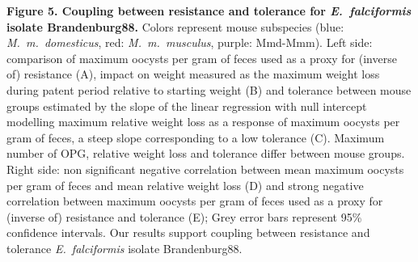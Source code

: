 \documentclass[12pt]{article}
\begin{document}
\textbf{Figure 5. Coupling between resistance and tolerance for \textit{E.~falciformis} isolate Brandenburg88.} Colors represent mouse subspecies (blue: \textit{M.~m.~domesticus}, red: \textit{M.~m.~musculus}, purple: Mmd-Mmm). Left side: comparison of maximum oocysts per gram of feces used as a proxy for (inverse of) resistance (A), impact on weight measured as the maximum weight loss during patent period relative to starting weight (B) and tolerance between mouse groups estimated by the slope of the linear regression with null intercept modelling maximum relative weight loss as a response of maximum oocysts per gram of feces, a steep slope corresponding to a low tolerance (C). Maximum number of OPG, relative weight loss and tolerance differ between mouse groups. Right side: non significant negative correlation between mean maximum oocysts per gram of feces and mean relative weight loss (D) and strong negative correlation between maximum oocysts per gram of feces used as a proxy for (inverse of) resistance and tolerance (E); Grey error bars represent 95\% confidence intervals. Our results support coupling between resistance and tolerance \textit{E.~falciformis} isolate Brandenburg88.
\end{document}

